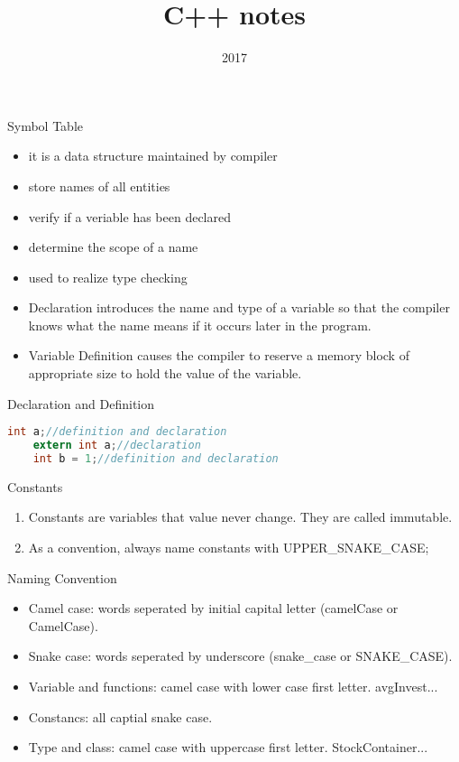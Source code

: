 \documentclass[a4paper]{tufte-handout}
\title{C++ notes}
\date{2017}
\begin{document}
\maketitle

\begin{projects}
  Symbol Table
  \begin{itemize}
  \item it is a data structure maintained by compiler
  \item store names of all entities
  \item verify if a veriable has been declared
  \item determine the scope of a name
  \item used to realize type checking
  \end{itemize}

  \begin{itemize}
  \item Declaration introduces the name and type of a variable so that the compiler knows what the name means if it occurs later in the program.
  \item Variable Definition causes the compiler to reserve a memory block of appropriate size to hold the value of the variable.
  \end{itemize}

  Declaration and Definition
  \begin{lstlisting}[language=C]
    int a;//definition and declaration
    extern int a;//declaration
    int b = 1;//definition and declaration
  \end{lstlisting}
\end{projects}

Constants
\begin{enumerate}
\item Constants are variables that value never change. They are called immutable.
\item As a convention, always name constants with UPPER\_SNAKE\_CASE;
\end{enumerate}

Naming Convention
\begin{itemize}
\item Camel case: words seperated by initial capital letter (camelCase or CamelCase).
\item Snake case: words seperated by underscore (snake\_case or SNAKE\_CASE).
\item Variable and functions: camel case with lower case first letter. avgInvest...
\item Constancs: all captial snake case.
\item Type and class: camel case with uppercase first letter. StockContainer...
\end{itemize}
\end{document}
